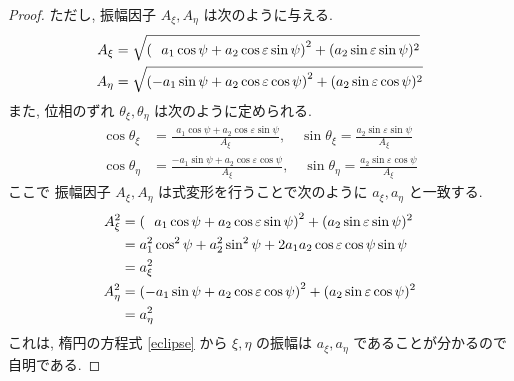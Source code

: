 \documentclass[uplatex,a4paper,dvipdfmx]{jsarticle}
\theoremstyle{definition}
\begin{document}
\begin{proof}
  ただし, 振幅因子 $A_\xi, A_\eta$ は次のように与える.
  \begin{align}
    A_\xi  & = \sqrt{\qty(\ \ a_1\cos\psi + a_2\cos\varepsilon\sin\psi)^2 + (a_2\sin\varepsilon\sin\psi)^2} \\
    A_\eta & = \sqrt{\qty(-a_1\sin\psi + a_2\cos\varepsilon\cos\psi)^2 + (a_2\sin\varepsilon\cos\psi)^2}
  \end{align}
  また, 位相のずれ $\theta_\xi, \theta_\eta$ は次のように定められる.
  \begin{align}
    \cos\theta_\xi  & = \frac{\ \ a_1\cos\psi + a_2\cos\varepsilon\sin\psi}{A_\xi}, \quad \sin\theta_\xi = \frac{a_2\sin\varepsilon\sin\psi}{A_\xi}  \\
    \cos\theta_\eta & = \frac{-a_1\sin\psi + a_2\cos\varepsilon\cos\psi}{A_\xi},    \quad \sin\theta_\eta = \frac{a_2\sin\varepsilon\cos\psi}{A_\xi}
  \end{align}
  ここで 振幅因子 $A_\xi, A_\eta$ は式変形を行うことで次のように $a_\xi, a_\eta$ と一致する.
  \begin{align}
    A_\xi^2  & = \qty(\ \ a_1\cos\psi + a_2\cos\varepsilon\sin\psi)^2 + (a_2\sin\varepsilon\sin\psi)^2 \\
             & = a_1^2\cos^2\psi + a_2^2\sin^2\psi + 2a_1a_2\cos\varepsilon\cos\psi\sin\psi            \\
             & = a_\xi^2                                                                               \\
    A_\eta^2 & = \qty(-a_1\sin\psi + a_2\cos\varepsilon\cos\psi)^2 + (a_2\sin\varepsilon\cos\psi)^2    \\
             & = a_\eta^2
  \end{align}
  これは, 楕円の方程式 \eqref{eclipse} から $\xi, \eta$ の振幅は $a_\xi, a_\eta$ であることが分かるので自明である.


\end{proof}
\end{document}
